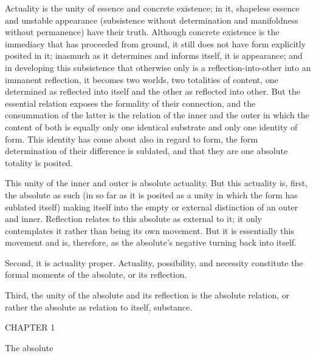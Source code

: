 Actuality is the unity of essence and concrete existence;
in it, shapeless essence and unstable appearance
(subsistence without determination
and manifoldness without permanence)
have their truth.
Although concrete existence is the immediacy
that has proceeded from ground,
it still does not have form explicitly posited in it;
inasmuch as it determines and informs itself, it is appearance;
and in developing this subsistence that otherwise only is
a reflection-into-other into an immanent reflection,
it becomes two worlds, two totalities of content,
one determined as reflected into itself
and the other as reflected into other.
But the essential relation exposes
the formality of their connection,
and the consummation of the latter is
the relation of the inner and the outer
in which the content of both is equally
only one identical substrate
and only one identity of form.
This identity has come about also in regard to form,
the form determination of their difference is sublated,
and that they are one absolute totality is posited.

This unity of the inner and outer is absolute actuality.
But this actuality is, first, the absolute as such
(in so far as it is posited as a unity
in which the form has sublated itself)
making itself into the empty or external distinction
of an outer and inner.
Reflection relates to this absolute as external to it;
it only contemplates it rather than being its own movement.
But it is essentially this movement
and is, therefore, as the absolute's
negative turning back into itself.

Second, it is actuality proper.
Actuality, possibility, and necessity constitute
the formal moments of the absolute, or its reflection.

Third, the unity of the absolute and its reflection is
the absolute relation, or rather the absolute as
relation to itself, substance.

CHAPTER 1

The absolute

